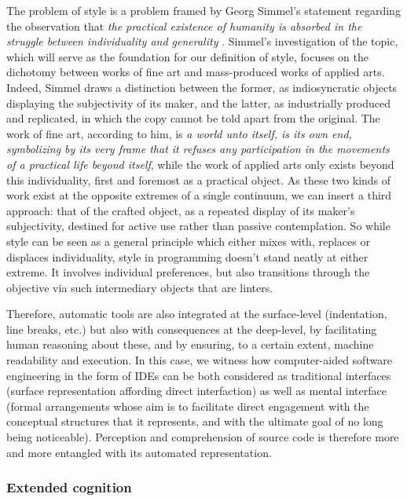 
The problem of style is a problem framed by Georg Simmel's statement regarding the observation that \emph{the practical existence of humanity is absorbed in the struggle between individuality and generality} \citep{simmel_problem_1991}. Simmel's investigation of the topic, which will serve as the foundation for our definition of style, focuses on the dichotomy between works of fine art and mass-produced works of applied arts. Indeed, Simmel draws a distinction between the former, as indiosyncratic objects displaying the subjectivity of its maker, and the latter, as industrially produced and replicated, in which the copy cannot be told apart from the original. The work of fine art, according to him, is \emph{a world unto itself, is its own end, symbolizing by its very frame that it refuses any participation in the movements of a practical life beyond itself}, while the work of applied arts only exists beyond this individuality, first and foremost as a practical object. As these two kinds of work exist at the opposite extremes of a single continuum, we can insert a third approach: that of the crafted object, as a repeated display of its maker's subjectivity, destined for active use rather than passive contemplation. So while style can be seen as a general principle which either mixes with, replaces or displaces individuality, style in programming doesn't stand neatly at either extreme. It involves individual preferences, but also transitions through the objective via such intermediary objects that are linters.

Therefore, automatic tools are also integrated at the surface-level (indentation, line breaks, etc.) but also with consequences at the deep-level, by facilitating human reasoning about these, and by ensuring, to a certain extent, machine readability and execution. In this case, we witness how computer-aided software engineering in the form of IDEs can be both considered as traditional interfaces (surface representation affording direct interfaction) as well as mental interface (formal arrangements whose aim is to facilitate direct engagement with the conceptual structures that it represents, and with the ultimate goal of no long being noticeable). Perception and comprehension of source code is therefore more and more entangled with its automated representation.

\subsubsection{Extended cognition}
\label{subsubsec:extended-cognition}

